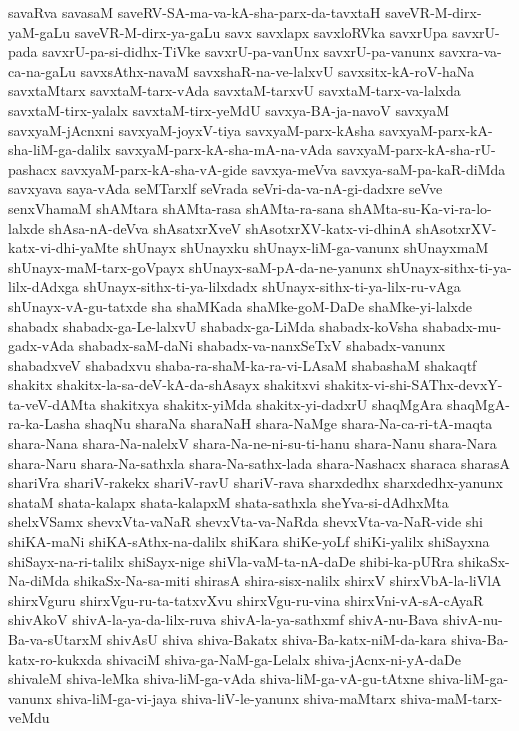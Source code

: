 {savaRva
savasaM
saveRV-SA-ma-va-kA-sha-parx-da-tavxtaH
saveVR-M-dirx-yaM-gaLu
saveVR-M-dirx-ya-gaLu
savx
savxlapx
savxloRVka
savxrUpa
savxrU-pada
savxrU-pa-si-didhx-TiVke
savxrU-pa-vanUnx
savxrU-pa-vanunx
savxra-va-ca-na-gaLu
savxsAthx-navaM
savxshaR-na-ve-lalxvU
savxsitx-kA-roV-haNa
savxtaMtarx
savxtaM-tarx-vAda
savxtaM-tarxvU
savxtaM-tarx-va-lalxda
savxtaM-tirx-yalalx
savxtaM-tirx-yeMdU
savxya-BA-ja-navoV
savxyaM
savxyaM-jAcnxni
savxyaM-joyxV-tiya
savxyaM-parx-kAsha
savxyaM-parx-kA-sha-liM-ga-dalilx
savxyaM-parx-kA-sha-mA-na-vAda
savxyaM-parx-kA-sha-rU-pashacx
savxyaM-parx-kA-sha-vA-gide
savxya-meVva
savxya-saM-pa-kaR-diMda
savxyava
saya-vAda
seMTarxlf
seVrada
seVri-da-va-nA-gi-dadxre
seVve
senxVhamaM
shAMtara
shAMta-rasa
shAMta-ra-sana
shAMta-su-Ka-vi-ra-lo-lalxde
shAsa-nA-deVva
shAsatxrXveV
shAsotxrXV-katx-vi-dhinA
shAsotxrXV-katx-vi-dhi-yaMte
shUnayx
shUnayxku
shUnayx-liM-ga-vanunx
shUnayxmaM
shUnayx-maM-tarx-goVpayx
shUnayx-saM-pA-da-ne-yanunx
shUnayx-sithx-ti-ya-lilx-dAdxga
shUnayx-sithx-ti-ya-lilxdadx
shUnayx-sithx-ti-ya-lilx-ru-vAga
shUnayx-vA-gu-tatxde
sha
shaMKada
shaMke-goM-DaDe
shaMke-yi-lalxde
shabadx
shabadx-ga-Le-lalxvU
shabadx-ga-LiMda
shabadx-koVsha
shabadx-mu-gadx-vAda
shabadx-saM-daNi
shabadx-va-nanxSeTxV
shabadx-vanunx
shabadxveV
shabadxvu
shaba-ra-shaM-ka-ra-vi-LAsaM
shabashaM
shakaqtf
shakitx
shakitx-la-sa-deV-kA-da-shAsayx
shakitxvi
shakitx-vi-shi-SAThx-devxY-ta-veV-dAMta
shakitxya
shakitx-yiMda
shakitx-yi-dadxrU
shaqMgAra
shaqMgA-ra-ka-Lasha
shaqNu
sharaNa
sharaNaH
shara-NaMge
shara-Na-ca-ri-tA-maqta
shara-Nana
shara-Na-nalelxV
shara-Na-ne-ni-su-ti-hanu
shara-Nanu
shara-Nara
shara-Naru
shara-Na-sathxla
shara-Na-sathx-lada
shara-Nashacx
sharaca
sharasA
shariVra
shariV-rakekx
shariV-ravU
shariV-rava
sharxdedhx
sharxdedhx-yanunx
shataM
shata-kalapx
shata-kalapxM
shata-sathxla
sheYva-si-dAdhxMta
shelxVSamx
shevxVta-vaNaR
shevxVta-va-NaRda
shevxVta-va-NaR-vide
shi
shiKA-maNi
shiKA-sAthx-na-dalilx
shiKara
shiKe-yoLf
shiKi-yalilx
shiSayxna
shiSayx-na-ri-talilx
shiSayx-nige
shiVla-vaM-ta-nA-daDe
shibi-ka-pURra
shikaSx-Na-diMda
shikaSx-Na-sa-miti
shirasA
shira-sisx-nalilx
shirxV
shirxVbA-la-liVlA
shirxVguru
shirxVgu-ru-ta-tatxvXvu
shirxVgu-ru-vina
shirxVni-vA-sA-cAyaR
shivAkoV
shivA-la-ya-da-lilx-ruva
shivA-la-ya-sathxmf
shivA-nu-Bava
shivA-nu-Ba-va-sUtarxM
shivAsU
shiva
shiva-Bakatx
shiva-Ba-katx-niM-da-kara
shiva-Ba-katx-ro-kukxda
shivaciM
shiva-ga-NaM-ga-Lelalx
shiva-jAcnx-ni-yA-daDe
shivaleM
shiva-leMka
shiva-liM-ga-vAda
shiva-liM-ga-vA-gu-tAtxne
shiva-liM-ga-vanunx
shiva-liM-ga-vi-jaya
shiva-liV-le-yanunx
shiva-maMtarx
shiva-maM-tarx-veMdu
}
